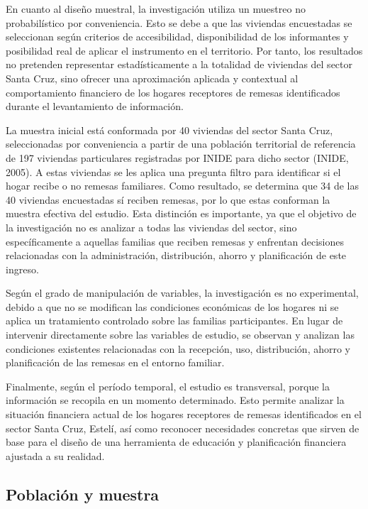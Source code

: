 \documentclass[12pt,letterpaper]{article}
\begin{document}
En cuanto al diseño muestral, la investigación utiliza un muestreo no probabilístico por conveniencia. Esto se debe a que las viviendas encuestadas se seleccionan según criterios de accesibilidad, disponibilidad de los informantes y posibilidad real de aplicar el instrumento en el territorio. Por tanto, los resultados no pretenden representar estadísticamente a la totalidad de viviendas del sector Santa Cruz, sino ofrecer una aproximación aplicada y contextual al comportamiento financiero de los hogares receptores de remesas identificados durante el levantamiento de información.

La muestra inicial está conformada por 40 viviendas del sector Santa Cruz, seleccionadas por conveniencia a partir de una población territorial de referencia de 197 viviendas particulares registradas por INIDE para dicho sector (INIDE, 2005). A estas viviendas se les aplica una pregunta filtro para identificar si el hogar recibe o no remesas familiares. Como resultado, se determina que 34 de las 40 viviendas encuestadas sí reciben remesas, por lo que estas conforman la muestra efectiva del estudio. Esta distinción es importante, ya que el objetivo de la investigación no es analizar a todas las viviendas del sector, sino específicamente a aquellas familias que reciben remesas y enfrentan decisiones relacionadas con la administración, distribución, ahorro y planificación de este ingreso.

Según el grado de manipulación de variables, la investigación es no experimental, debido a que no se modifican las condiciones económicas de los hogares ni se aplica un tratamiento controlado sobre las familias participantes. En lugar de intervenir directamente sobre las variables de estudio, se observan y analizan las condiciones existentes relacionadas con la recepción, uso, distribución, ahorro y planificación de las remesas en el entorno familiar.

Finalmente, según el período temporal, el estudio es transversal, porque la información se recopila en un momento determinado. Esto permite analizar la situación financiera actual de los hogares receptores de remesas identificados en el sector Santa Cruz, Estelí, así como reconocer necesidades concretas que sirven de base para el diseño de una herramienta de educación y planificación financiera ajustada a su realidad.

\subsection{\texorpdfstring{\textbf{Población y muestra}}{Población y muestra}}\label{poblaciuxf3n-y-muestra}
\end{document}
